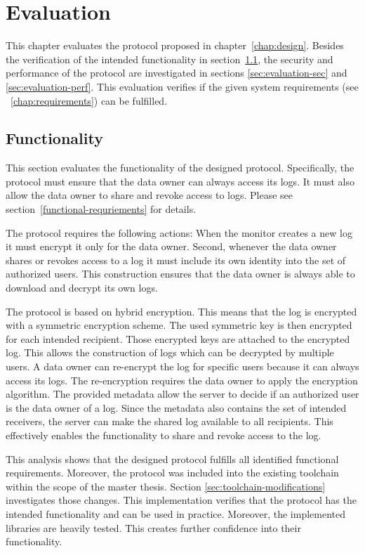 \documentclass[../main.tex]{subfiles}
\begin{document}
\chapter{Evaluation}

This chapter evaluates the protocol proposed in chapter~\ref{chap:design}.
Besides the verification of the intended functionality in section~\ref{sec:evaluation-func}, the security and performance of the protocol are investigated in sections \ref{sec:evaluation-sec} and \ref{sec:evaluation-perf}.
This evaluation verifies if the given system requirements (see ~\ref{chap:requirements}) can be fulfilled.

\section{Functionality}
\label{sec:evaluation-func}

This section evaluates the functionality of the designed protocol.
Specifically, the protocol must ensure that the data owner can always access its logs.
It must also allow the data owner to share and revoke access to logs.
Please see section~\ref{functional-requriements} for details.

The protocol requires the following actions:
When the monitor creates a new log it must encrypt it only for the data owner.
Second, whenever the data owner shares or revokes access to a log it must include its own identity into the set of authorized users.
This construction ensures that the data owner is always able to download and decrypt its own logs.

The protocol is based on hybrid encryption.
This means that the log is encrypted with a symmetric encryption scheme.
The used symmetric key is then encrypted for each intended recipient.
Those encrypted keys are attached to the encrypted log.
This allows the construction of logs which can be decrypted by multiple users.
A data owner can re-encrypt the log for specific users because it can always access its logs.
The re-encryption requires the data owner to apply the encryption algorithm.
The provided metadata allow the server to decide if an authorized user is the data owner of a log.
Since the metadata also contains the set of intended receivers, the server can make the shared log available to all recipients. 
This effectively enables the functionality to share and revoke access to the log.

This analysis shows that the designed protocol fulfills all identified functional requirements.
Moreover, the protocol was included into the existing toolchain within the scope of the master thesis.
Section \ref{sec:toolchain-modifications} investigates those changes.
This implementation verifies that the protocol has the intended functionality and can be used in practice.
Moreover, the implemented libraries are heavily tested.
This creates further confidence into their functionality.
\end{document}
